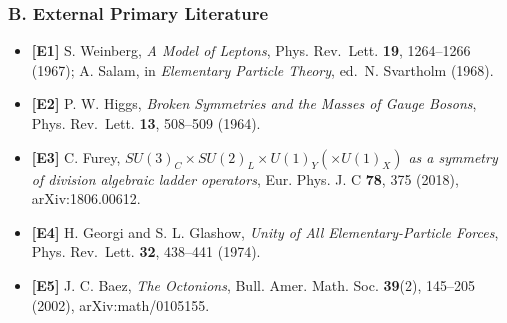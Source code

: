 \documentclass[
  a4paper,
]{article}
\providecommand{\tightlist}{%
  \setlength{\itemsep}{0pt}\setlength{\parskip}{0pt}}
\begin{document}
\subsubsection{B. External Primary
Literature}\label{b.-external-primary-literature}

\begin{itemize}
\tightlist
\item
  \textbf{{[}E1{]}} S. Weinberg, \emph{A Model of Leptons}, Phys.
  Rev.~Lett. \textbf{19}, 1264--1266 (1967); A. Salam, in
  \emph{Elementary Particle Theory}, ed.~N. Svartholm (1968).
\item
  \textbf{{[}E2{]}} P. W. Higgs, \emph{Broken Symmetries and the Masses
  of Gauge Bosons}, Phys. Rev.~Lett. \textbf{13}, 508--509 (1964).
\item
  \textbf{{[}E3{]}} C. Furey,
  \emph{\(SU(3)_C \times SU(2)_L \times U(1)_Y (\times U(1)_X)\) as a
  symmetry of division algebraic ladder operators}, Eur. Phys. J. C
  \textbf{78}, 375 (2018), arXiv:1806.00612.
\item
  \textbf{{[}E4{]}} H. Georgi and S. L. Glashow, \emph{Unity of All
  Elementary-Particle Forces}, Phys. Rev.~Lett. \textbf{32}, 438--441
  (1974).
\item
  \textbf{{[}E5{]}} J. C. Baez, \emph{The Octonions}, Bull. Amer. Math.
  Soc. \textbf{39}(2), 145--205 (2002), arXiv:math/0105155.
\end{itemize}
\end{document}
